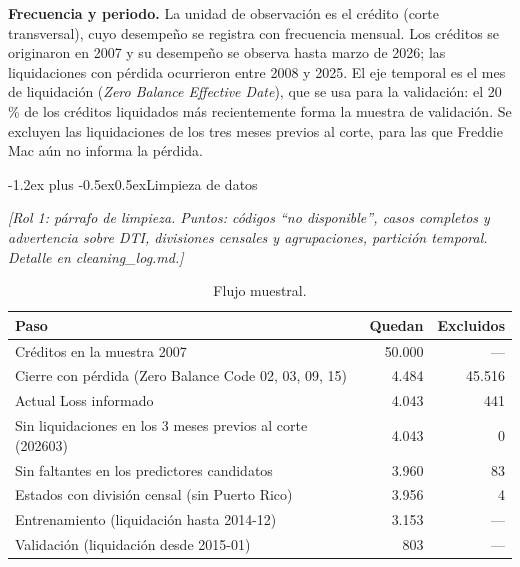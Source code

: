 \documentclass[10pt]{article}
\makeatletter
\renewcommand{\section}{\@startsection{section}{1}{0pt}%
  {-1.2ex plus -0.5ex}{0.5ex}{\normalfont\large\bfseries}}
\makeatother
\begin{document}
\textbf{Frecuencia y periodo.} La unidad de observación es el crédito (corte transversal),
cuyo desempeño se registra con frecuencia mensual. Los créditos se originaron en 2007 y su
desempeño se observa hasta marzo de 2026; las liquidaciones con pérdida ocurrieron entre
2008 y 2025. El eje temporal es el mes de liquidación (\emph{Zero Balance Effective Date}),
que se usa para la validación: el 20\,\% de los créditos liquidados más recientemente forma
la muestra de validación. Se excluyen las liquidaciones de los tres meses previos al corte,
para las que Freddie Mac aún no informa la pérdida.

\section{Limpieza de datos}

\textit{[Rol 1: párrafo de limpieza. Puntos: códigos ``no disponible'',
casos completos y advertencia sobre DTI, divisiones censales y agrupaciones, partición
temporal. Detalle en cleaning\_log.md.]}

\begin{table}[H]
  \centering\small
  \caption{Flujo muestral.}
  \begin{tabular}{lrr}
    \toprule
    Paso & Quedan & Excluidos \\
    \midrule
    Créditos en la muestra 2007                                  & 50.000 & --- \\
    Cierre con pérdida (Zero Balance Code 02, 03, 09, 15)        &  4.484 & 45.516 \\
    Actual Loss informado                                         &  4.043 &    441 \\
    Sin liquidaciones en los 3 meses previos al corte (202603)    &  4.043 &      0 \\
    Sin faltantes en los predictores candidatos                   &  3.960 &     83 \\
    Estados con división censal (sin Puerto Rico)                 &  3.956 &      4 \\
    \midrule
    \quad Entrenamiento (liquidación hasta 2014-12)               &  3.153 & --- \\
    \quad Validación (liquidación desde 2015-01)                  &    803 & --- \\
    \bottomrule
  \end{tabular}
\end{table}
\end{document}

